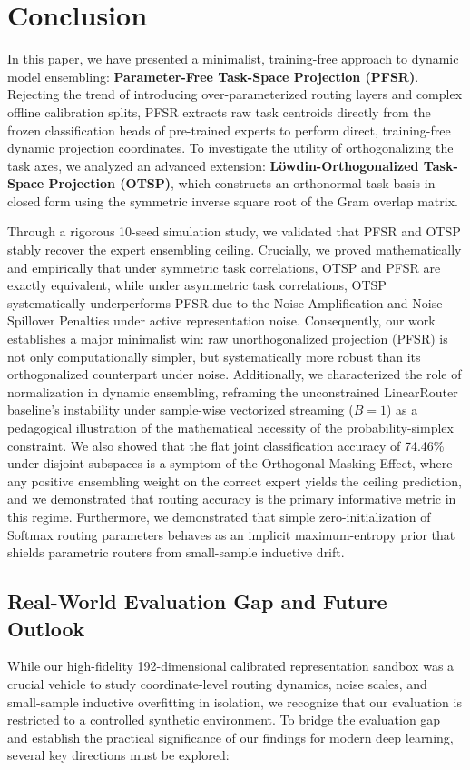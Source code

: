 \section{Conclusion}
\label{sec:conclusion}

In this paper, we have presented a minimalist, training-free approach to dynamic model ensembling: \textbf{Parameter-Free Task-Space Projection (PFSR)}. Rejecting the trend of introducing over-parameterized routing layers and complex offline calibration splits, PFSR extracts raw task centroids directly from the frozen classification heads of pre-trained experts to perform direct, training-free dynamic projection coordinates. To investigate the utility of orthogonalizing the task axes, we analyzed an advanced extension: \textbf{L{\"o}wdin-Orthogonalized Task-Space Projection (OTSP)}, which constructs an orthonormal task basis in closed form using the symmetric inverse square root of the Gram overlap matrix.

Through a rigorous 10-seed simulation study, we validated that PFSR and OTSP stably recover the expert ensembling ceiling. Crucially, we proved mathematically and empirically that under symmetric task correlations, OTSP and PFSR are exactly equivalent, while under asymmetric task correlations, OTSP systematically underperforms PFSR due to the Noise Amplification and Noise Spillover Penalties under active representation noise. Consequently, our work establishes a major minimalist win: raw unorthogonalized projection (PFSR) is not only computationally simpler, but systematically more robust than its orthogonalized counterpart under noise. Additionally, we characterized the role of normalization in dynamic ensembling, reframing the unconstrained LinearRouter baseline's instability under sample-wise vectorized streaming ($B=1$) as a pedagogical illustration of the mathematical necessity of the probability-simplex constraint. We also showed that the flat joint classification accuracy of 74.46\% under disjoint subspaces is a symptom of the Orthogonal Masking Effect, where any positive ensembling weight on the correct expert yields the ceiling prediction, and we demonstrated that routing accuracy is the primary informative metric in this regime. Furthermore, we demonstrated that simple zero-initialization of Softmax routing parameters behaves as an implicit maximum-entropy prior that shields parametric routers from small-sample inductive drift.

\subsection{Real-World Evaluation Gap and Future Outlook}
While our high-fidelity 192-dimensional calibrated representation sandbox was a crucial vehicle to study coordinate-level routing dynamics, noise scales, and small-sample inductive overfitting in isolation, we recognize that our evaluation is restricted to a controlled synthetic environment. To bridge the evaluation gap and establish the practical significance of our findings for modern deep learning, several key directions must be explored:

